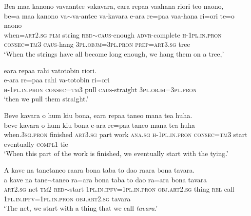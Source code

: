 \ea\label{ex:text20-15}
Bea maa kanono vavaantee vakavara, eara repaa vaahana riori teo naono,\\
\gll be=a	maa	kanono	va{$\sim$}va-antee	va-kavara	e-ara	re=paa	vaa-hana	ri=ori	te=o	naono\\
     when=\textsc{art}2.\textsc{sg}	\textsc{plm}	string	\textsc{red}{$\sim$}\textsc{caus}-enough	\textsc{advr}-complete	\textsc{h}-1\textsc{pl}.\textsc{in}.\textsc{pron}	\textsc{consec}=\textsc{tm}3	\textsc{caus}-hang	3\textsc{pl}.\textsc{objm}=3\textsc{pl}.\textsc{pron}	\textsc{prep}=\textsc{art}3.\textsc{sg}	tree\\
\glt `When the strings have all become long enough, we hang them on a tree,'
\z

\ea\label{ex:text20-16}
eara repaa rahi vatotobin riori.\\
\gll e-ara	re=paa	rahi	va-totobin	ri=ori\\
     \textsc{h}-1\textsc{pl}.\textsc{in}.\textsc{pron}	\textsc{consec}=\textsc{tm}3	pull	\textsc{caus}-straight	3\textsc{pl}.\textsc{objm}=3\textsc{pl}.\textsc{pron}\\
\glt `then we pull them straight.'
\z

\ea\label{ex:text20-17}
Beve kavara o hum kiu bona, eara repaa taneo mana tea huha.\\
\gll beve	kavara	o	hum	kiu	bona	e-ara	re=paa	taneo	mana	tea	huha\\
     when.3\textsc{sg}.\textsc{pron}	finished	\textsc{art}3.\textsc{sg}	part	work	\textsc{ana}.\textsc{sg}	\textsc{h}-1\textsc{pl}.\textsc{in}.\textsc{pron}	\textsc{consec}=\textsc{tm}3	start	eventually	\textsc{compl}1	tie\\
\glt `When this part of the work is finished, we eventually start with the tying.'
\z

\ea\label{ex:text20-18}
A kave na tanetaneo raara bona taba to dao raara bona tavara.\\
\gll a	kave	na	tane{$\sim$}taneo	ra=ara	bona	taba	to	dao	ra=ara	bona	tavara\\
     \textsc{art}2.\textsc{sg}	net	\textsc{tm}2	\textsc{red}{$\sim$}start	1\textsc{pl}.\textsc{in}.\textsc{ipfv}=1\textsc{pl}.\textsc{in}.\textsc{pron}	\textsc{obj}.\textsc{art}2.\textsc{sg}	thing	\textsc{rel}	call	1\textsc{pl}.\textsc{in}.\textsc{ipfv}=1\textsc{pl}.\textsc{in}.\textsc{pron}	\textsc{obj}.\textsc{art}2.\textsc{sg}	tavara\\
\glt `The net, we start with a thing that we call \textit{tavara}.'
\z

